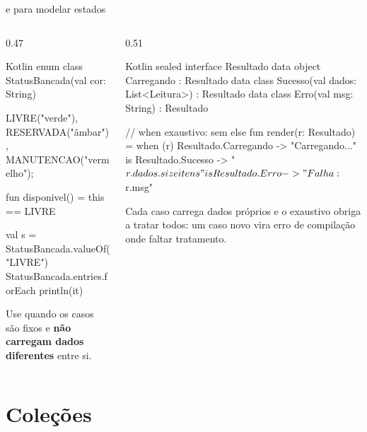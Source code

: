 \documentclass[aspectratio=169,10pt]{beamer}
\begin{document}
\begin{frame}[fragile]{ e  para modelar estados}
  \begin{columns}[T]
    \begin{column}{0.47\textwidth}
\begin{codigo}[title=Enum]{Kotlin}
enum class StatusBancada(val cor: String) {
  LIVRE("verde"),
  RESERVADA("âmbar"),
  MANUTENCAO("vermelho");

  fun disponivel() = this == LIVRE
}

val s = StatusBancada.valueOf("LIVRE")
StatusBancada.entries.forEach { println(it) }
\end{codigo}
      \begin{dica}
        Use  quando os casos são fixos e \textbf{não carregam dados diferentes} entre si.
      \end{dica}
    \end{column}
    \begin{column}{0.51\textwidth}
\begin{codigo}[title=Sealed interface]{Kotlin}
sealed interface Resultado {
  data object Carregando : Resultado
  data class Sucesso(val dados: List<Leitura>)
    : Resultado
  data class Erro(val msg: String) : Resultado
}

// when exaustivo: sem else
fun render(r: Resultado) = when (r) {
  Resultado.Carregando -> "Carregando..."
  is Resultado.Sucesso -> "${r.dados.size} itens"
  is Resultado.Erro    -> "Falha: ${r.msg}"
}
\end{codigo}
      \begin{conceito}
        Cada caso carrega dados próprios e o  exaustivo obriga a tratar todos: um caso novo vira erro de compilação onde faltar tratamento.
      \end{conceito}
    \end{column}
  \end{columns}
\end{frame}

\section{Coleções}
\end{document}
